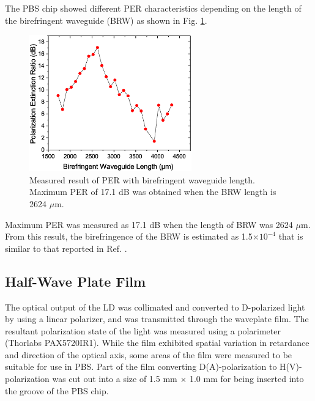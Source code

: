 \documentclass[letterpaper, 10pt]{article}
\begin{document}
The PBS chip showed different PER characteristics depending on the length of the birefringent waveguide (BRW) as shown in Fig. \ref{fig:BRW-PER}.
\begin{figure}
  \centering
  \includegraphics[width=7cm]{./BRWPER.eps}
  \caption{Measured result of PER with birefringent waveguide length. Maximum PER of 17.1 dB was obtained when the BRW length is 2624 $\mu$m.}
  \label{fig:BRW-PER}
\end{figure}
Maximum PER was measured as 17.1 dB  when the length of BRW was 2624 $\mu$m.
From this result, the birefringence of the BRW is estimated as 1.5$\times 10^{-4}$ that is similar to that reported in Ref. \cite{Hashizume:2015ta}.


\subsection{Half-Wave Plate Film}
The optical output of the LD  was collimated and converted to D-polarized light by using a linear polarizer, and was transmitted through the waveplate film.
The resultant polarization state of the light was measured using a polarimeter (Thorlabs PAX5720IR1).
While the film exhibited spatial variation in retardance and direction of the optical axis, some areas of the film were measured to be suitable for use in PBS.
Part of the film converting D(A)-polarization to H(V)-polarization was cut out into a size of 1.5 mm $\times$ 1.0 mm for being inserted into the groove of the PBS chip.
\end{document}
